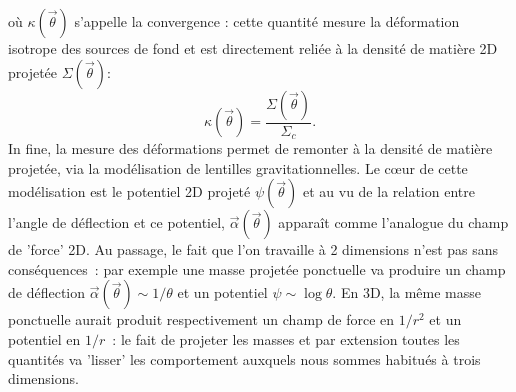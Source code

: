 où $\kappa (\vec{\theta})$ s'appelle la convergence : cette quantité mesure la déformation isotrope des sources de fond et est directement reliée à la densité de matière 2D projetée $\Sigma(\vec{\theta})$:
\begin{equation}
\kappa (\vec{\theta}) =\frac{\Sigma(\vec{\theta})}{\Sigma_c}.
\end{equation}
In fine, la mesure des déformations permet de remonter à la densité de matière projetée, via la modélisation de lentilles gravitationnelles. Le cœur de cette modélisation est le potentiel 2D projeté $\psi(\vec{\theta})$ et au vu de la relation entre l'angle de déflection et ce potentiel, $\vec{\alpha}(\vec{\theta})$ apparaît comme l'analogue du champ de 'force' 2D. Au passage, le fait que l'on travaille à 2 dimensions n'est pas sans conséquences~: par exemple une masse projetée ponctuelle va produire un champ de déflection $\vec{\alpha}(\vec{\theta})\sim 1/\theta$ et un potentiel $\psi \sim \log \theta$. En 3D, la même masse ponctuelle aurait produit respectivement un champ de force en $1/r^2$ et un potentiel en $1/r$~: le fait de projeter les masses et par extension toutes les quantités va 'lisser' les comportement auxquels nous sommes habitués à trois dimensions.
